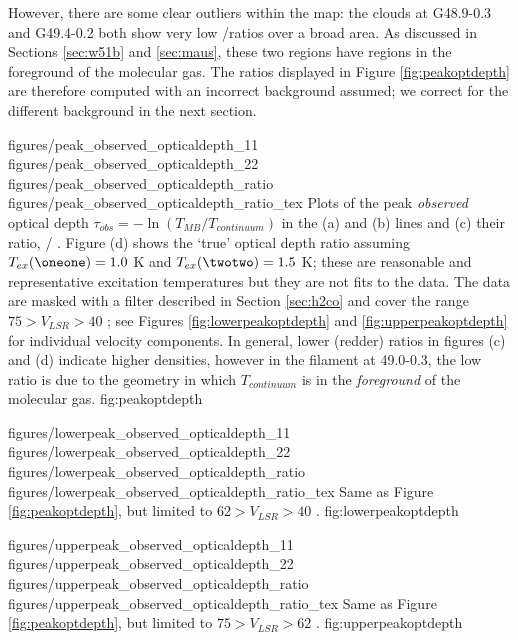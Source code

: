 However, there are some clear outliers within the map: the clouds at G48.9-0.3
and G49.4-0.2 both show very low \oneone/\twotwo ratios over a broad area.  As
discussed in Sections \ref{sec:w51b} and \ref{sec:maus}, these two regions have
\hii regions in the foreground of the molecular gas.  The ratios displayed in
Figure \ref{fig:peakoptdepth} are therefore computed with an incorrect
background assumed; we correct for the different background in the next section.

\FigureFourPDF
{figures/peak_observed_opticaldepth_11}
{figures/peak_observed_opticaldepth_22}
{figures/peak_observed_opticaldepth_ratio}
{figures/peak_observed_opticaldepth_ratio_tex}
{Plots of the peak \emph{observed} optical depth $\tau_{obs} =
-\ln(T_{MB}/T_{continuum})$ in the (a) \oneone and (b) \twotwo lines and (c)
their ratio, \oneone / \twotwo.  Figure (d) shows the `true' optical depth ratio
assuming $T_{ex}(\oneone) = 1.0$ K and $T_{ex}(\twotwo) = 1.5$ K; these are
reasonable and representative excitation temperatures but they are not fits to
the data.
The data are masked with a filter described in Section \ref{sec:h2co} and cover
the range $75 > V_{LSR} > 40$ \kms; see Figures \ref{fig:lowerpeakoptdepth} and
\ref{fig:upperpeakoptdepth} for individual velocity components.  In general,
lower (redder) ratios in figures (c) and (d) indicate higher densities, however
in the filament at 49.0-0.3, the low ratio is due to the geometry in which
$T_{continuum}$ is in the \emph{foreground} of the molecular gas.}
{fig:peakoptdepth}


\FigureFourPDF
{figures/lowerpeak_observed_opticaldepth_11}
{figures/lowerpeak_observed_opticaldepth_22}
{figures/lowerpeak_observed_opticaldepth_ratio}
{figures/lowerpeak_observed_opticaldepth_ratio_tex}
{Same as Figure \ref{fig:peakoptdepth}, but limited to $62 > V_{LSR} > 40$ \kms.}
{fig:lowerpeakoptdepth}

\FigureFourPDF
{figures/upperpeak_observed_opticaldepth_11}
{figures/upperpeak_observed_opticaldepth_22}
{figures/upperpeak_observed_opticaldepth_ratio}
{figures/upperpeak_observed_opticaldepth_ratio_tex}
{Same as Figure \ref{fig:peakoptdepth}, but limited to $75 > V_{LSR} > 62$ \kms.}
{fig:upperpeakoptdepth}

